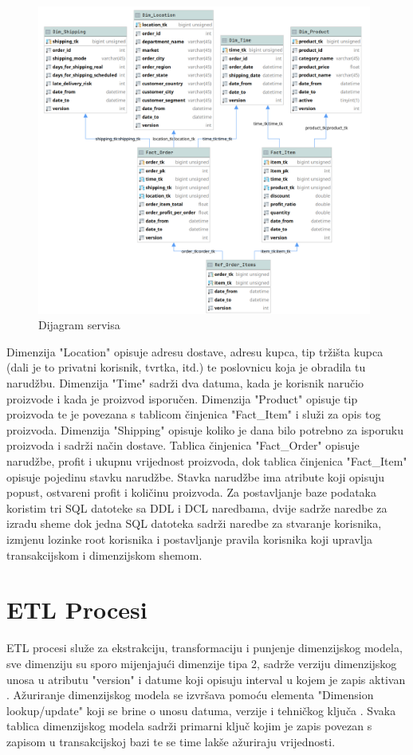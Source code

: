 \documentclass[12pt, oneside]{book}
\begin{document}
\begin{figure}[h]
\includegraphics[width=11cm]{images/i02_data_co_schema_dim.png}
\centering
\caption{Dijagram servisa}
\end{figure}

Dimenzija "Location" opisuje adresu dostave, adresu kupca, tip tržišta kupca (dali je to privatni korisnik, tvrtka, itd.) te poslovnicu koja je obradila tu narudžbu. Dimenzija "Time" sadrži dva datuma, kada je korisnik naručio proizvode i kada je proizvod isporučen. Dimenzija "Product" opisuje tip proizvoda te je povezana s tablicom činjenica "Fact\_Item" i služi za opis tog proizvoda. Dimenzija "Shipping" opisuje koliko je dana bilo potrebno za isporuku proizvoda i sadrži način dostave. Tablica činjenica "Fact\_Order" opisuje narudžbe, profit i ukupnu vrijednost proizvoda, dok tablica činjenica "Fact\_Item" opisuje pojedinu stavku narudžbe. Stavka narudžbe ima atribute koji opisuju popust, ostvareni profit i količinu proizvoda. Za postavljanje baze podataka koristim tri SQL datoteke sa DDL i DCL naredbama, dvije sadrže naredbe za izradu sheme dok jedna SQL datoteka sadrži naredbe za stvaranje korisnika, izmjenu lozinke root korisnika i postavljanje pravila korisnika koji upravlja transakcijskom i dimenzijskom shemom.



\chapter{ETL Procesi}
\label{Cetl}
ETL procesi služe za ekstrakciju, transformaciju i punjenje dimenzijskog modela, sve dimenziju su sporo mijenjajući dimenzije tipa 2, sadrže verziju dimenzijskog unosa u atributu "version" i datume koji opisuju interval u kojem je zapis aktivan . Ažuriranje dimenzijskog modela se izvršava pomoću elementa "Dimension lookup/update" koji se brine o unosu datuma, verzije i tehničkog ključa \cite{pentaho}. Svaka tablica dimenzijskog modela sadrži primarni ključ kojim je zapis povezan s zapisom u transakcijskoj bazi te se time lakše ažuriraju vrijednosti.
\end{document}

